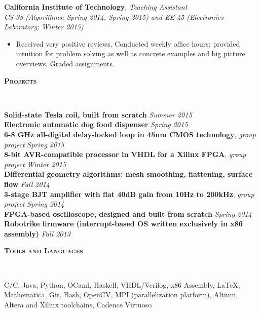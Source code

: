 \documentclass{article}
\newenvironment{changemargin}[2]{%
  \begin{list}{}{%
    \setlength{\topsep}{0pt}%
    \setlength{\leftmargin}{#1}%
    \setlength{\rightmargin}{#2}%
    \setlength{\listparindent}{\parindent}%
    \setlength{\itemindent}{\parindent}%
    \setlength{\parsep}{\parskip}%
  }%
  \item[]}{\end{list}
}
\newcommand{\lineover}{
	\begin{changemargin}{-0.05in}{-0.05in}
		\vspace*{-8pt}
		\hrulefill \\
		\vspace*{-2pt}
	\end{changemargin}
}
\newcommand{\header}[1]{
	\begin{changemargin}{-.5in}{-0.5in}
		{\large \textbf{\scshape{#1}}}\\
  	\lineover
	\end{changemargin}
}
\newenvironment{body} {
	\vspace*{-16pt}
	\begin{changemargin}{-0.25in}{-0.5in}
  }	
	{\end{changemargin}
}
\newcommand{\CC}{C\nolinebreak\hspace{-.05em}\raisebox{.4ex}{\tiny\bf +}\nolinebreak\hspace{-.10em}\raisebox{.4ex}{\tiny\bf +}}
\begin{document}
\begin{body}
	\smallskip

	\textbf{California Institute of Technology}, \emph{Teaching Assistant} \\
	\emph{CS 38 (Algorithms; Spring 2014, Spring 2015) and EE 45 (Electronics Laboratory; Winter 2015)}
	\vspace*{-4pt}
	\begin{itemize}
		\item Received very positive reviews. Conducted weekly office hours; provided intuition for problem solving as well as concrete examples and big picture overviews. Graded assignments.
	\end{itemize}
\end{body}

\smallskip

\header{Projects}
\begin{body}
	\vspace{14pt}
	\textbf{Solid-state Tesla coil, built from scratch} \hfill \emph{Summer 2015} \\
	\textbf{Electronic automatic dog food dispenser} \hfill \emph{Spring 2015} \\
	\textbf{6-8 GHz all-digital delay-locked loop in 45nm CMOS technology}, \emph{group project} \hfill \emph{Spring 2015}\\
	\textbf{8-bit AVR-compatible processor in VHDL for a Xilinx FPGA}, \emph{group project} \hfill \emph{Winter 2015}\\
	\textbf{Differential geometry algorithms: mesh smoothing, flattening, surface flow} \hfill \emph{Fall 2014}\\
	\textbf{3-stage BJT amplifier with flat 40dB gain from 10Hz to 200kHz}, \emph{group project} \hfill \emph{Spring 2014}\\
	\textbf{FPGA-based oscilloscope, designed and built from scratch} \hfill \emph{Spring 2014}\\
	\textbf{Robotrike firmware (interrupt-based OS written exclusively in x86 assembly)} \hfill \emph{Fall 2013}\\
\end{body}

\medskip

\header{Tools and Languages}

\begin{body}
	\vspace{14pt}
	C/\CC, Java, Python, OCaml, Haskell, VHDL/Verilog, x86 Assembly, \LaTeX, Mathematica, Git, Bash, OpenCV, MPI (parallelization platform), Altium, Altera and Xilinx toolchains, Cadence Virtuoso
\end{body}
\end{document}
